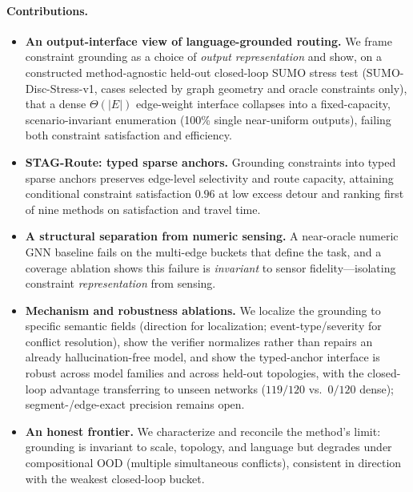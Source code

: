 \paragraph{Contributions.}
\begin{itemize}
  \item \textbf{An output-interface view of language-grounded routing.} We frame constraint grounding as a
        choice of \emph{output representation} and show, on a constructed method-agnostic held-out
        closed-loop SUMO stress test (SUMO-Disc-Stress-v1, cases selected by graph geometry and oracle
        constraints only), that a dense $\Theta(|E|)$ edge-weight interface collapses into a
        fixed-capacity, scenario-invariant enumeration (100\% single near-uniform outputs), failing both
        constraint satisfaction and efficiency.
  \item \textbf{STAG-Route: typed sparse anchors.} Grounding constraints into typed sparse anchors
        preserves edge-level selectivity and route capacity, attaining conditional constraint satisfaction
        $0.96$ at low excess detour and ranking first of nine methods on satisfaction and travel time.
  \item \textbf{A structural separation from numeric sensing.} A near-oracle numeric GNN baseline fails on
        the multi-edge buckets that define the task, and a coverage ablation shows this failure is
        \emph{invariant} to sensor fidelity---isolating constraint \emph{representation} from sensing.
  \item \textbf{Mechanism and robustness ablations.} We localize the grounding to specific semantic fields
        (direction for localization; event-type/severity for conflict resolution), show the verifier
        normalizes rather than repairs an already hallucination-free model, and show the typed-anchor
        interface is robust across model families and across held-out topologies, with the closed-loop
        advantage transferring to unseen networks ($119/120$ vs.\ $0/120$ dense); segment-/edge-exact
        precision remains open.
  \item \textbf{An honest frontier.} We characterize and reconcile the method's limit: grounding is
        invariant to scale, topology, and language but degrades under compositional OOD (multiple
        simultaneous conflicts), consistent in direction with the weakest closed-loop bucket.
\end{itemize}

